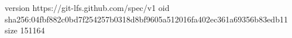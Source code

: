 version https://git-lfs.github.com/spec/v1
oid sha256:04fbf882c0bd7f254257b0318d8bf9605a512016fa402ec361a69356b83edb11
size 151164
